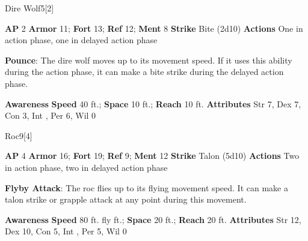 \begin{monsection}{Dire Wolf}{5}[2]
\vspace{-1em}\vspace{-1em}
\begin{spellcontent}
\begin{spelltargetinginfo}
{\textbf{AP} 2}
\pari \textbf{Armor} 11;
\textbf{Fort} 13;
\textbf{Ref} 12;
\textbf{Ment} 8
\pari \textbf{Strike} Bite  (2d10)
\pari \textbf{Actions} One in action phase, one in delayed action phase
\end{spelltargetinginfo}
\begin{spelleffects}
\pari
\textbf{Pounce}:
The dire wolf moves up to its movement speed.
If it uses this ability during the action phase, it can make a bite strike during the delayed action phase.
\end{spelleffects}
\end{spellcontent}
\begin{spellsubcontent}
\begin{spellfooter}
\pari \textbf{Awareness} 
\pari \textbf{Speed} 40 ft.;
\textbf{Space} 10 ft.;
\textbf{Reach} 10 ft.
\pari \textbf{Attributes}
Str 7,
Dex 7,
Con 3,
Int ,
Per 6,
Wil 0
\end{spellfooter}
\end{spellsubcontent}
\end{monsection}
\begin{monsection}{Roc}{9}[4]
\vspace{-1em}\vspace{-1em}
\begin{spellcontent}
\begin{spelltargetinginfo}
{\textbf{AP} 4}
\pari \textbf{Armor} 16;
\textbf{Fort} 19;
\textbf{Ref} 9;
\textbf{Ment} 12
\pari \textbf{Strike} Talon  (5d10)
\pari \textbf{Actions} Two in action phase, two in delayed action phase
\end{spelltargetinginfo}
\begin{spelleffects}
\pari
\textbf{Flyby Attack}:
The roc flies up to its flying movement speed.
It can make a talon strike or grapple attack at any point during this movement.
\end{spelleffects}
\end{spellcontent}
\begin{spellsubcontent}
\begin{spellfooter}
\pari \textbf{Awareness} 
\pari \textbf{Speed} 80 ft. fly ft.;
\textbf{Space} 20 ft.;
\textbf{Reach} 20 ft.
\pari \textbf{Attributes}
Str 12,
Dex 10,
Con 5,
Int ,
Per 5,
Wil 0
\end{spellfooter}
\end{spellsubcontent}
\end{monsection}
